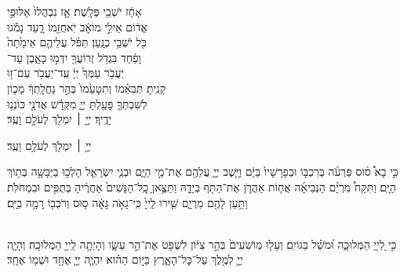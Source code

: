 \documentclass[twoside, openany, parskip=half, 11pt]{book}
\begin{document}
אָחַ֔ז יֹשְׁבֵ֖י פְּלָֽשֶׁת׃ \hfill אָ֤ז נִבְהֲלוּ֙ אַלּוּפֵ֣י \\
אֱד֔וֹם \hfill אֵילֵ֣י מוֹאָ֔ב יֹֽאחֲזֵ֖מוֹ רָ֑עַד \hfill נָמֹ֕גוּ \\
כֹּ֖ל יֹשְׁבֵ֥י כְנָֽעַן׃ \hfill תִּפֹּ֨ל עֲלֵיהֶ֤ם אֵימָ֙תָה֙ \\
וָפַ֔חַד \hfill בִּגְדֹ֥ל זְרוֹעֲךָ֖ יִדְּמ֣וּ כָּאָ֑בֶן \hfill עַד־\\
יַעֲבֹ֤ר עַמְּךָ֙ יְיָ֔ \hfill עַֽד־יַעֲבֹ֖ר עַם־ז֥וּ \\
קָנִֽיתָ׃ \hfill תְּבִאֵ֗מוֹ וְתִטָּעֵ֙מוֹ֙ בְּהַ֣ר נַחֲלָֽתְךָ֔ \hfill מָכ֧וֹן \\
לְשִׁבְתְּךָ֛ פָּעַ֖לְתָּ יְיָ֑ \hfill מִקְּדָ֕שׁ אֲדֹנָ֖י כּוֹנְנ֥וּ \\
יָדֶֽיךָ׃ \hfill יְיָ֥ ׀ יִמְלֹ֖ךְ לְעֹלָ֥ם וָעֶֽד׃\hfill \break
\begin{small}
יְיָ֥ ׀ יִמְלֹ֖ךְ לְעֹלָ֥ם וָעֶֽד׃\\
\end{small}
\begin{small}
כִּ֣י בָא֩ ס֨וּס פַּרְעֹ֜ה בְּרִכְבּ֤וֹ וּבְפָרָשָׁיו֙ בַּיָּ֔ם וַיָּ֧שֶׁב יְיָ֛ עֲלֵהֶ֖ם אֶת־מֵ֣י הַיָּ֑ם וּבְנֵ֧י יִשְׂרָאֵ֛ל הָלְכ֥וּ בַיַּבָּשָׁ֖ה בְּת֥וֹךְ הַיָּֽם׃ וַתִּקַּח֩ מִרְיָ֨ם הַנְּבִיאָ֜ה אֲח֧וֹת אַהֲרֹ֛ן אֶת־הַתֹּ֖ף בְּיָדָ֑הּ וַתֵּצֶ֤אןָ כׇֽל־הַנָּשִׁים֙ אַחֲרֶ֔יהָ בְּתֻפִּ֖ים וּבִמְחֹלֹֽת׃ וַתַּ֥עַן לָהֶ֖ם מִרְיָ֑ם שִׁ֤ירוּ לַֽייָ֙ כִּֽי־גָאֹ֣ה גָּאָ֔ה ס֥וּס וְרֹכְב֖וֹ רָמָ֥ה בַיָּֽם׃\end{small}
\\
כִּ֣י לַ֭ייָ֭ הַמְּלוּכָ֑ה וּ֝מֹשֵׁ֗ל בַּגּוֹיִֽם׃
וְעָל֤וּ מֽוֹשִׁעִים֙ בְּהַ֣ר צִיּ֔וֹן לִשְׁפֹּ֖ט אֶת־הַ֣ר עֵשָׂ֑ו וְהָיְתָ֥ה לַֽייָ֖ הַמְּלוּכָֽה׃
וְהָיָ֧ה יְיָ֛ לְמֶ֖לֶךְ עַל־כׇּל־הָאָ֑רֶץ בַּיּ֣וֹם הַה֗וּא יִהְיֶ֧ה יְיָ֛ אֶחָ֖ד וּשְׁמ֥וֹ אֶחָֽד׃
\end{document}

